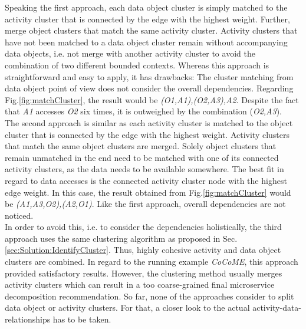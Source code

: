 \noindent
Speaking the first approach, each data object cluster is simply matched to the activity cluster that is connected by the edge with the highest weight. Further, merge object clusters that match the same activity cluster. Activity clusters that have not been matched to a data object cluster remain without accompanying data objects, i.e. not merge with another activity cluster to avoid the combination of two different bounded contexts. Whereas this approach is straightforward and easy to apply, it has drawbacks: The cluster matching from data object point of view does not consider the overall dependencies. Regarding Fig.\ref{fig:matchCluster}, the result would be \textit{(O1,A1),(O2,A3),A2}. Despite the fact that \textit{A1} accesses \textit{O2} six times, it is outweighed by the combination (\textit{O2,A3}).  \\
The second approach is similar as each activity cluster is matched to the object cluster that is connected by the edge with the highest weight. Activity clusters that match the same object clusters are merged. Solely object clusters that remain unmatched in the end need to be matched with one of its connected activity clusters, as the data needs to be available somewhere. The best fit in regard to data accesses is the connected activity cluster node with the highest edge weight. In this case, the result obtained from Fig.\ref{fig:matchCluster} would be \textit{(A1,A3,O2),(A2,O1)}. Like the first approach, overall dependencies are not noticed. \\
In order to avoid this, i.e. to consider the dependencies holistically, the third approach uses the same clustering algorithm as proposed in Sec.\ref{sec:Solution:IdentifyCluster}. Thus, highly cohesive activity and data object clusters are combined. In regard to the running example \textit{CoCoME}, this approach provided satisfactory results. However, the clustering method usually merges activity clusters which can result in a too coarse-grained final microservice decomposition recommendation. So far, none of the approaches consider to split data object or activity clusters. For that, a closer look to the actual activity-data-relationships has to be taken. \\
